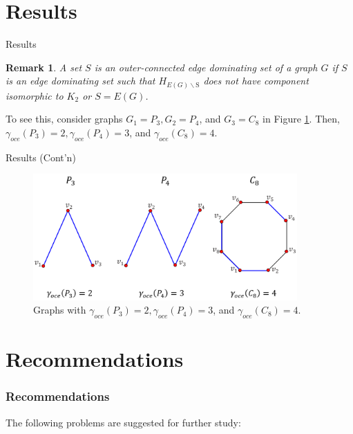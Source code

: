 \documentclass[xcolor=dvipsnames,envcountsect]{beamer}
\newtheorem{remark}[theorem]{Remark}
\renewcommand{\indent}{\hspace*{2em}}
\begin{document}
\section{Results}
\begin{frame}{Results}
		\begin{remark}\label{rem: 1}
		A set $S$ is an outer-connected edge dominating set of a graph $G$ if $S$ is an edge dominating set such that $H_{E(G) \backslash \mathrm{S}}$ does not have component isomorphic to $K_{2}$ or $S=E(G)$.
		\end{remark}
	\pause
	\indent To see this, consider graphs $G_{1}=P_{3}, G_{2}=P_{4}$, and $G_{3}=C_{8}$ in Figure \ref{3.1}.
	Then, $\gamma_{oce}(P_{3})=2, \gamma_{oce}(P_{4})=3$, and $\gamma_{o c e}(C_{8})=4$.
\end{frame}
\begin{frame}{Results (Cont'n)}
		\begin{figure}[ht]
		\centering
		\includegraphics[width=0.9\textwidth]{./Figures/3.1.png}
		\caption{Graphs with $\gamma_{oce}(P_{3})=2, \gamma_{oce}(P_{4})=3$, and $\gamma_{oce}(C_{8})=4$.\label{3.1}}
		\end{figure} 
\end{frame}

\section{Recommendations}
\begin{frame}
	\frametitle{Recommendations}
	\justifying

    The following problems are suggested for further study:\\
    
    \lipsum[5]
    \nocite{ordaz2019collective,ordaz2021flock,ordaz2021autonomous}
\end{frame}
\end{document}
